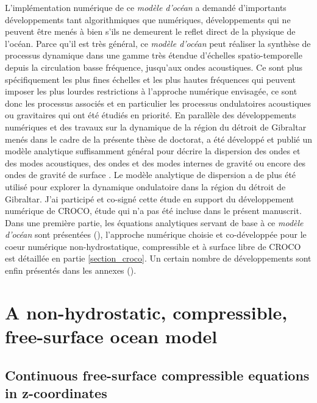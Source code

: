 L'implémentation numérique de ce \textit{modèle d'océan} a demandé d'importants développements tant algorithmiques que numériques, développements qui ne peuvent être menés à bien s'ils ne demeurent le reflet direct de la physique de l'océan. Parce qu'il est très général, ce \textit{modèle d'océan} peut réaliser la synthèse de processus dynamique dans une gamme très étendue d'échelles spatio-temporelle depuis la circulation basse fréquence, jusqu'aux ondes acoustiques. Ce sont plus spécifiquement les plus fines échelles et les plus hautes fréquences qui peuvent imposer les plus lourdes restrictions à l'approche numérique envisagée, ce sont donc les processus associés et en particulier les processus ondulatoires acoustiques ou gravitaires qui ont été étudiés en priorité. En parallèle des développements numériques et des travaux sur la dynamique de la région du détroit de Gibraltar menés dans le cadre de la présente thèse de doctorat, a été développé et publié un modèle analytique suffisamment général pour décrire la dispersion des ondes et des modes acoustiques, des ondes et des modes internes de gravité ou encore des ondes de gravité de surface \citep{auclair_modied_2021}. Le modèle analytique de dispersion a de plus été utilisé pour explorer la dynamique ondulatoire dans la région du détroit de Gibraltar.
J'ai participé et co-signé cette étude en support du développement numérique de CROCO, étude qui n'a pas été incluse dans le présent manuscrit.\\
Dans une première partie, les équations analytiques servant de base à ce \textit{modèle d'océan} sont présentées (), l'approche numérique choisie et co-développée pour le coeur numérique non-hydrostatique, compressible et à surface libre de CROCO est détaillée en partie \ref{section_croco}. Un certain nombre de développements sont enfin présentés dans les annexes ().

\color{black}

\section{A non-hydrostatic, compressible, free-surface ocean model}
\label{section_prim_eq}

 \subsection{Continuous free-surface compressible equations in z-coordinates}
\label{subsectiongenesystem}
